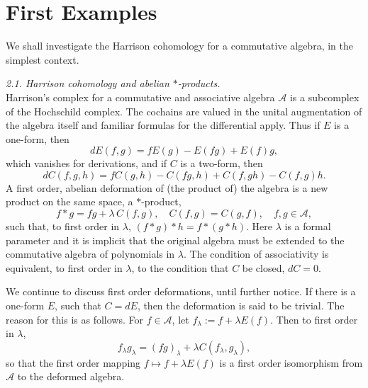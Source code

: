 \documentclass[a4paper,a4paper]{article}
\begin{document}
\section{First Examples}  %
 
  We shall investigate the Harrison  cohomology for a commutative
algebra, in the simplest context.

\smallskip

\noindent\textit{2.1. Harrison cohomology  and abelian $*$-products.}\\
Harrison's complex  for a commutative and associative algebra 
${\mathcal{A}}$ is a subcomplex of the Hochschild complex. The cochains are 
valued in the unital augmentation of the algebra itself and familiar formulas
for the differential apply. Thus if $E$ is a one-form, then
$$
dE(f,g) = fE(g) -E(fg) + E(f)g,
$$
which vanishes for derivations, and if $C$ is a two-form, then
$$
dC(f,g,h) = fC(g,h) - C(fg,h) + C(f,gh) - C(f,g)h.
$$
A first order, abelian deformation of  (the product of) the algebra  is a
new product on the same space, a $*$-product,
$$
f*g = fg + \lambda \,C(f,g),\quad C(f,g) = C(g,f),\quad f,g \in {\mathcal{A}},
$$
such that, to first order in $\lambda$, $ (f*g)* h = f*(g*h)$. Here
$\lambda$ is a formal parameter and it is implicit that the original
algebra must be extended to the commutative algebra of polynomials in
$\lambda$. 
 The condition of associativity  is equivalent, to first order in
$\lambda$, to the condition that $C$ be closed, $dC = 0$.

We continue to discuss first order deformations, until further notice.
If there is a one-form $E$, such that $C = dE$, then the deformation is
said to be trivial. The reason for this is as follows. For 
$f \in {\mathcal{A}}$, let $f_\lambda := f + \lambda E(f)$. 
Then to first order in $\lambda$,
$$
 f_\lambda g_\lambda = (fg)_\lambda + \lambda C(f_\lambda,g_\lambda),
$$
so that the first order mapping  $f \mapsto f + \lambda E(f)$ 
is a first order isomorphism from ${\mathcal{A}}$  to the deformed algebra. 

\smallskip
\end{document}
